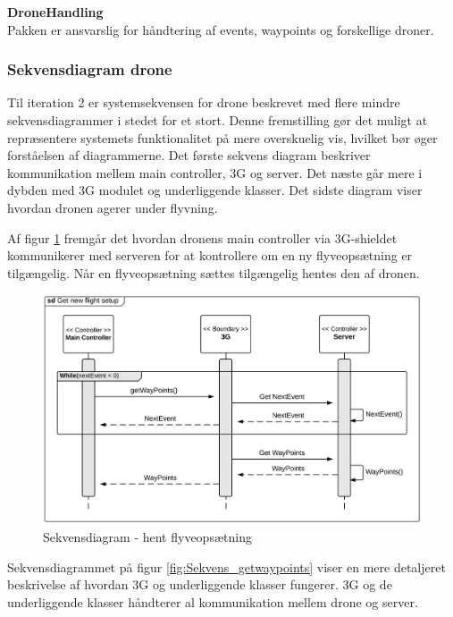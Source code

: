 \textbf{DroneHandling}\\
Pakken er ansvarslig for håndtering af events, waypoints og forskellige droner.

\newpage

\subsubsection*{Sekvensdiagram drone}

Til iteration 2 er systemsekvensen for drone beskrevet med flere mindre sekvensdiagrammer i stedet for et stort. Denne fremstilling gør det muligt at repræsentere systemets funktionalitet på mere overskuelig vis, hvilket bør øger forståelsen af diagrammerne. Det første sekvens diagram beskriver kommunikation mellem main controller, 3G og server. Det næste går mere i dybden med 3G modulet og underliggende klasser. Det sidste diagram viser hvordan dronen agerer under flyvning.


Af figur \ref{fig:Sekvens_diagram_iteration2_2} fremgår det hvordan dronens main controller via 3G-shieldet kommunikerer med serveren for at kontrollere om en ny flyveopsætning er tilgængelig. Når en flyveopsætning sættes tilgængelig hentes den af dronen. 

\begin{figure}[H]
	\centering
	\includegraphics[width=1\textwidth]{Billeder/sekvens/sekvens_iteration2_2}
	\caption{Sekvensdiagram - hent flyveopsætning}
	\label{fig:Sekvens_diagram_iteration2_2}
\end{figure}

\newpage

Sekvensdiagrammet på figur \ref{fig:Sekvens_getwaypoints} viser en mere detaljeret beskrivelse af hvordan 3G og underliggende klasser fungerer. 3G og de underliggende klasser håndterer al kommunikation mellem drone og server.

